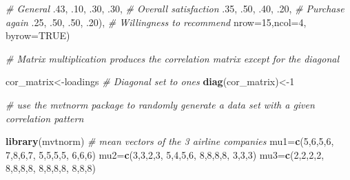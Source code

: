 \documentclass[]{book}
\newenvironment{Shaded}{\begin{snugshade}}{\end{snugshade}}
\newcommand{\KeywordTok}[1]{\textcolor[rgb]{0.13,0.29,0.53}{\textbf{{#1}}}}
\newcommand{\DataTypeTok}[1]{\textcolor[rgb]{0.13,0.29,0.53}{{#1}}}
\newcommand{\DecValTok}[1]{\textcolor[rgb]{0.00,0.00,0.81}{{#1}}}
\newcommand{\StringTok}[1]{\textcolor[rgb]{0.31,0.60,0.02}{{#1}}}
\newcommand{\CommentTok}[1]{\textcolor[rgb]{0.56,0.35,0.01}{\textit{{#1}}}}
\newcommand{\OtherTok}[1]{\textcolor[rgb]{0.56,0.35,0.01}{{#1}}}
\newcommand{\NormalTok}[1]{{#1}}
\theoremstyle{definition}
\theoremstyle{definition}
\theoremstyle{remark}
\begin{document}
\begin{Shaded}
\begin{Highlighting}[]
  \CommentTok{# General   }
  \NormalTok{.}\DecValTok{43}\NormalTok{, .}\DecValTok{10}\NormalTok{, .}\DecValTok{30}\NormalTok{, .}\DecValTok{30}\NormalTok{,  }\CommentTok{# Overall satisfaction}
  \NormalTok{.}\DecValTok{35}\NormalTok{, .}\DecValTok{50}\NormalTok{, .}\DecValTok{40}\NormalTok{, .}\DecValTok{20}\NormalTok{,  }\CommentTok{# Purchase again}
  \NormalTok{.}\DecValTok{25}\NormalTok{, .}\DecValTok{50}\NormalTok{, .}\DecValTok{50}\NormalTok{, .}\DecValTok{20}\NormalTok{), }\CommentTok{# Willingness to recommend}
  \DataTypeTok{nrow=}\DecValTok{15}\NormalTok{,}\DataTypeTok{ncol=}\DecValTok{4}\NormalTok{, }\DataTypeTok{byrow=}\OtherTok{TRUE}\NormalTok{)}
  
\CommentTok{# Matrix multiplication produces the correlation matrix except for the diagonal}
\NormalTok{cor_matrix<-loadings %
\CommentTok{# Diagonal set to ones}
\KeywordTok{diag}\NormalTok{(cor_matrix)<-}\DecValTok{1}

\CommentTok{# use the mvtnorm package to randomly generate a data set with a given correlation pattern}

\KeywordTok{library}\NormalTok{(mvtnorm)}
\CommentTok{# mean vectors of the 3 airline companies}
\NormalTok{mu1=}\KeywordTok{c}\NormalTok{(}\DecValTok{5}\NormalTok{,}\DecValTok{6}\NormalTok{,}\DecValTok{5}\NormalTok{,}\DecValTok{6}\NormalTok{, }\DecValTok{7}\NormalTok{,}\DecValTok{8}\NormalTok{,}\DecValTok{6}\NormalTok{,}\DecValTok{7}\NormalTok{, }\DecValTok{5}\NormalTok{,}\DecValTok{5}\NormalTok{,}\DecValTok{5}\NormalTok{,}\DecValTok{5}\NormalTok{, }\DecValTok{6}\NormalTok{,}\DecValTok{6}\NormalTok{,}\DecValTok{6}\NormalTok{)}
\NormalTok{mu2=}\KeywordTok{c}\NormalTok{(}\DecValTok{3}\NormalTok{,}\DecValTok{3}\NormalTok{,}\DecValTok{2}\NormalTok{,}\DecValTok{3}\NormalTok{, }\DecValTok{5}\NormalTok{,}\DecValTok{4}\NormalTok{,}\DecValTok{5}\NormalTok{,}\DecValTok{6}\NormalTok{, }\DecValTok{8}\NormalTok{,}\DecValTok{8}\NormalTok{,}\DecValTok{8}\NormalTok{,}\DecValTok{8}\NormalTok{, }\DecValTok{3}\NormalTok{,}\DecValTok{3}\NormalTok{,}\DecValTok{3}\NormalTok{)}
\NormalTok{mu3=}\KeywordTok{c}\NormalTok{(}\DecValTok{2}\NormalTok{,}\DecValTok{2}\NormalTok{,}\DecValTok{2}\NormalTok{,}\DecValTok{2}\NormalTok{, }\DecValTok{8}\NormalTok{,}\DecValTok{8}\NormalTok{,}\DecValTok{8}\NormalTok{,}\DecValTok{8}\NormalTok{, }\DecValTok{8}\NormalTok{,}\DecValTok{8}\NormalTok{,}\DecValTok{8}\NormalTok{,}\DecValTok{8}\NormalTok{, }\DecValTok{8}\NormalTok{,}\DecValTok{8}\NormalTok{,}\DecValTok{8}\NormalTok{)}

}
\end{Highlighting}
\end{Shaded}
\end{document}
